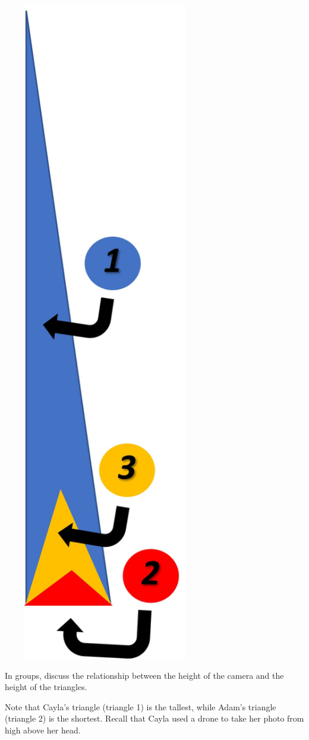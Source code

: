 \documentclass{ximera}
\begin{document}
\begin{exploration}
\begin{image}
         \includegraphics[width=3.5in]{matchedTriangles.jpg}
\end{image}

In groups, discuss the relationship between the height of the camera and the height of the triangles.

\begin{hint}
    Note that Cayla's triangle (triangle 1) is the tallest, while Adam's triangle (triangle 2) is the shortest.  Recall that Cayla used a drone to take her photo from high above her head.  
\end{hint}

\end{exploration}
\end{document}
